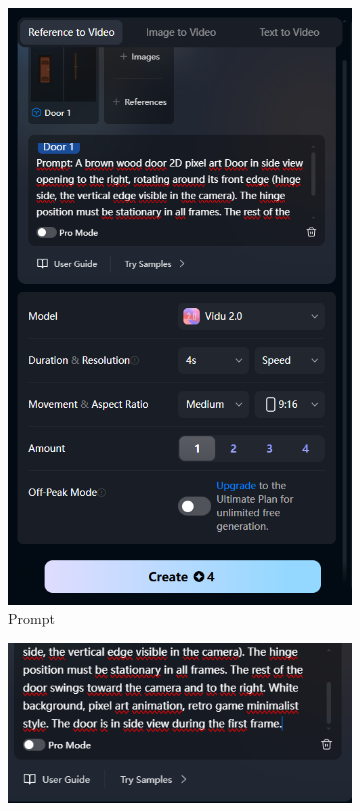 \begin{figure}[htbp]
    \centering
    \caption{\small Processo de geração da animação 2 da porta no Vidu }
    \label{fig:viduPorta2}
    \begin{subfigure}{0.42\linewidth}
        \includegraphics[width=1\linewidth]{figs/vidu/porta_tela1.PNG}
        \caption{\small Prompt}
        \label{fig:viduPorta2a}
    \end{subfigure}
    \begin{subfigure}{0.42\linewidth}
        \includegraphics[width=1\linewidth]{figs/vidu/porta_tela3.PNG}

\end{subfigure}
\end{figure}
